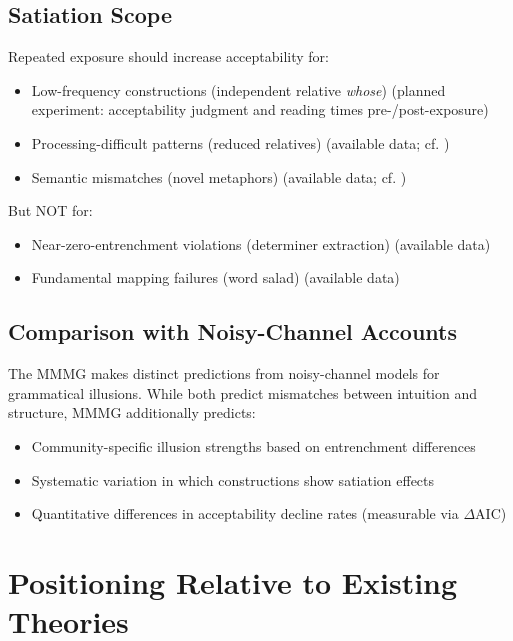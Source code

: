 \documentclass[12pt]{article}
\begin{document}
\subsection{Satiation Scope}

Repeated exposure should increase acceptability for:
\begin{itemize}
\item Low-frequency constructions (independent relative \textit{whose}) (planned experiment: acceptability judgment and reading times pre-/post-exposure)
\item Processing-difficult patterns (reduced relatives) (available data; cf. \parencite{snyder2000grammaticality,hofmeister2013processing})
\item Semantic mismatches (novel metaphors) (available data; cf. \parencite{giora1997understanding})
\end{itemize}

But NOT for:
\begin{itemize}
\item Near-zero-entrenchment violations (determiner extraction) (available data)
\item Fundamental mapping failures (word salad) (available data)
\end{itemize}

\subsection{Comparison with Noisy-Channel Accounts}

The MMMG makes distinct predictions from noisy-channel models \parencite{gibson2013} for grammatical illusions. While both predict mismatches between intuition and structure, MMMG additionally predicts:
\begin{itemize}
\item Community-specific illusion strengths based on entrenchment differences
\item Systematic variation in which constructions show satiation effects
\item Quantitative differences in acceptability decline rates (measurable via $\Delta \text{AIC}$)
\end{itemize}

\section{Positioning Relative to Existing Theories}
\end{document}
